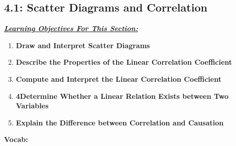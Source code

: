\documentclass{report}
\begin{document}
    \subsection{4.1: Scatter Diagrams and Correlation}
    \bigbreak \noindent 
    \textbf{\textit{\underline{Learning Objectives For This Section:}}}
    \begin{enumerate}
        \item \textbf{Draw and Interpret Scatter Diagrams}
        \item \textbf{Describe the Properties of the Linear Correlation Coefficient}
        \item \textbf{Compute and Interpret the Linear Correlation Coefficient}
        \item \textbf{4Determine Whether a Linear Relation Exists between Two Variables}
        \item \textbf{Explain the Difference between Correlation and Causation}
    \end{enumerate}
    \bigbreak \noindent 
    \textbf{Vocab:}
\end{document}
